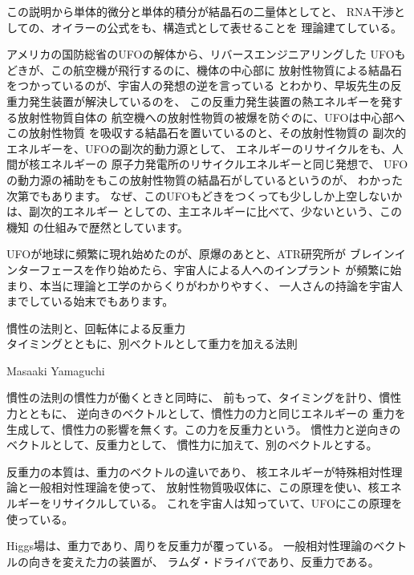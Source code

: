\documentclass{jsarticle}
\begin{document}
{   この説明から単体的微分と単体的積分が結晶石の二量体としてと、
   RNA干渉としての、オイラーの公式をも、構造式として表せることを
   理論建てしている。

   アメリカの国防総省のUFOの解体から、リバースエンジニアリングした
   UFOもどきが、この航空機が飛行するのに、機体の中心部に
   放射性物質による結晶石をつかっているのが、宇宙人の発想の逆を言っている
   とわかり、早坂先生の反重力発生装置が解決しているのを、
   この反重力発生装置の熱エネルギーを発する放射性物質自体の
   航空機への放射性物質の被爆を防ぐのに、UFOは中心部へこの放射性物質
   を吸収する結晶石を置いているのと、その放射性物質の
   副次的エネルギーを、UFOの副次的動力源として、
   エネルギーのリサイクルをも、人間が核エネルギーの
   原子力発電所のリサイクルエネルギーと同じ発想で、
   UFOの動力源の補助をもこの放射性物質の結晶石がしているというのが、
   わかった次第でもあります。
   なぜ、このUFOもどきをつくっても少ししか上空しないかは、副次的エネルギー
   としての、主エネルギーに比べて、少ないという、この機知
   の仕組みで歴然としています。

   UFOが地球に頻繁に現れ始めたのが、原爆のあとと、ATR研究所が
   ブレインインターフェースを作り始めたら、宇宙人による人へのインプラント
   が頻繁に始まり、本当に理論と工学のからくりがわかりやすく、
   一人さんの持論を宇宙人までしている始末でもあります。

\newpage
\begin{center}
\large	慣性の法則と、回転体による反重力 \\
タイミングとともに、別ベクトルとして重力を加える法則
\end{center}
\begin{center}
	Masaaki Yamaguchi
\end{center}

   慣性の法則の慣性力が働くときと同時に、
   前もって、タイミングを計り、慣性力とともに、
   逆向きのベクトルとして、慣性力の力と同じエネルギーの
   重力を生成して、慣性力の影響を無くす。この力を反重力という。
   慣性力と逆向きのベクトルとして、反重力として、
   慣性力に加えて、別のベクトルとする。

   反重力の本質は、重力のベクトルの違いであり、
   核エネルギーが特殊相対性理論と一般相対性理論を使って、
   放射性物質吸収体に、この原理を使い、核エネルギーをリサイクルしている。
   これを宇宙人は知っていて、UFOにこの原理を使っている。

   Higgs場は、重力であり、周りを反重力が覆っている。
   一般相対性理論のベクトルの向きを変えた力の装置が、
   ラムダ・ドライバであり、反重力である。

}
\end{document}
